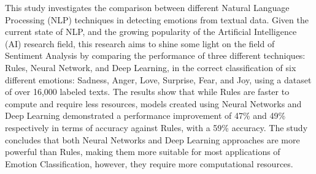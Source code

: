 This study investigates the comparison between different Natural Language Processing (NLP) techniques in detecting emotions from textual data. Given the current state of NLP, and the growing popularity of the Artificial Intelligence (AI) research field, this research aims to shine some light on the field of Sentiment Analysis by comparing the performance of three different techniques: Rules, Neural Network, and Deep Learning, in the correct classification of six different emotions: Sadness, Anger, Love, Surprise, Fear, and Joy, using a dataset of over 16,000 labeled texts. The results show that while Rules are faster to compute and require less resources, models created using Neural Networks and Deep Learning demonstrated a performance improvement of 47\% and 49\% respectively in terms of accuracy against Rules, with a 59\% accuracy. The study concludes that both Neural Networks and Deep Learning approaches are more powerful than Rules, making them more suitable for most applications of Emotion Classification, however, they require more computational resources.